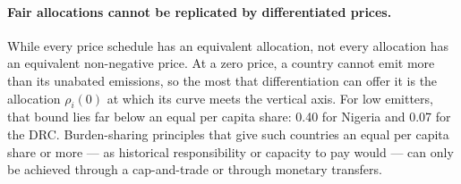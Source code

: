 \documentclass[12pt,english]{article}
\theoremstyle{remark}
\begin{document}
\paragraph{Fair allocations cannot be replicated by differentiated prices.} 
While every price schedule has an equivalent allocation, not every allocation has an equivalent non-negative price. At a zero price, a country cannot emit more than its unabated emissions, so the most that differentiation can offer it is the allocation $\rho_i(0)$ at which its curve meets the vertical axis. For low emitters, that bound lies far below an equal per capita share: 0.40 for Nigeria and 0.07 for the DRC. 
Burden-sharing principles that give such countries an equal per capita share or more --- as historical responsibility or capacity to pay would --- can only be achieved through a cap-and-trade or through monetary transfers. 


\end{document}
